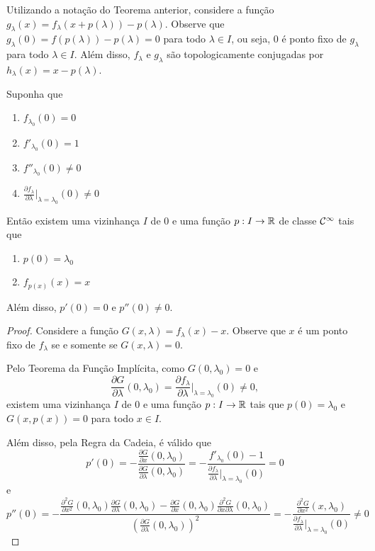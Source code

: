 Utilizando a notação do Teorema anterior, considere a função $g_\lambda(x) = f_\lambda(x + p(\lambda)) - p(\lambda)$. Observe que $g_\lambda(0) = f(p(\lambda)) - p(\lambda) = 0$ para todo $\lambda \in I$, ou seja, $0$ é ponto fixo de $g_\lambda$ para todo $\lambda \in I$. Além disso, $f_\lambda$ e $g_\lambda$ são topologicamente conjugadas por $h_\lambda(x) = x - p(\lambda)$.

\begin{theorem}
Suponha que
\begin{enumerate}
\item $f_{\lambda_0}(0) = 0$
\item $f'_{\lambda_0}(0) = 1$
\item $f''_{\lambda_0}(0) \neq 0$
\item $\frac{\partial f_\lambda}{\partial \lambda} |_{\lambda = \lambda_0}(0) \neq 0$
\end{enumerate}
Então existem uma vizinhança $I$ de $0$ e uma função $p: I \to \mathbb{R}$ de classe $\mathcal{C}^\infty$ tais que
\begin{enumerate}
\item $p(0) = \lambda_0$
\item $f_{p(x)}(x) = x$
\end{enumerate}
Além disso, $p'(0) = 0$ e $p''(0) \neq 0$.
\end{theorem}

\begin{proof}
Considere a função $G(x, \lambda) = f_\lambda(x) - x$. Observe que $x$ é um ponto fixo de $f_\lambda$ se e somente se $G(x, \lambda) = 0$.

Pelo Teorema da Função Implícita, como $G(0, \lambda_0) = 0$ e 
$$\frac{\partial G}{\partial \lambda}(0, \lambda_0) = \frac{\partial f_\lambda}{\partial \lambda}|_{\lambda = \lambda_0}(0) \neq 0,$$
existem uma vizinhança $I$ de $0$ e uma função $p: I \to \mathbb{R}$ tais que $p(0) = \lambda_0$ e $G(x, p(x)) = 0$ para todo $x \in I$.

Além disso, pela Regra da Cadeia, é válido que
$$p'(0) = - \frac{\frac{\partial G}{\partial x}(0, \lambda_0)}
{\frac{\partial G}{\partial \lambda}(0, \lambda_0)} = - \frac{f'_{\lambda_0}(0) - 1}{\frac{\partial f_\lambda}{\partial \lambda}|_{\lambda = \lambda_0}(0)} = 0$$
e
$$ p''(0) = - \frac{\frac{\partial^2 G}{\partial x^2}(0, \lambda_0)\frac{\partial G}{\partial \lambda}(0, \lambda_0) - \frac{\partial G}{\partial x}(0, \lambda_0) \frac{\partial^2 G}{ \partial x \partial \lambda}(0, \lambda_0)}
{\left( \frac{\partial G}{\partial \lambda}(0, \lambda_0) \right)^2}  = - \frac{\frac{\partial^2 G}{\partial x^2}(x, \lambda_0)}{ \frac{\partial f_\lambda}{\partial \lambda}|_{\lambda = \lambda_0}(0)} \neq 0 $$
\end{proof}

